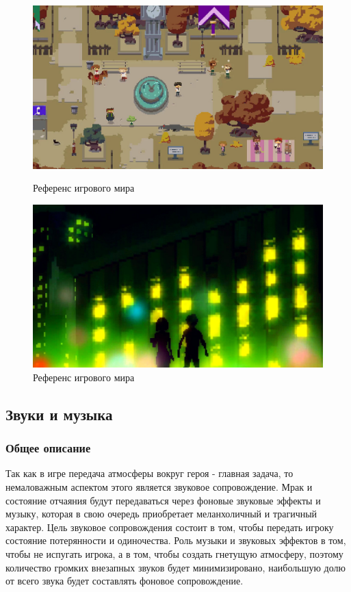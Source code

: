 \documentclass{article}
\begin{document}
	\begin{figure}[h]
		\begin{minipage}{0.4\textwidth}
			\centering
			\includegraphics[width=\textwidth]{images/park.jpg}
			\caption{Референс игрового мира}
			\label{fig:world1}
		\end{minipage} 
		\hfill
		\begin{minipage}{0.4\textwidth}
			\centering
			\includegraphics[width=\textwidth]{images/world.jpg}
			\caption{Референс игрового мира}
			\label{fig:world2}
		\end{minipage}
	\end{figure}
    
	\newpage	
	\subsection{Звуки и музыка}
	
	\subsubsection{Общее описание}

	Так как в игре передача атмосферы вокруг героя - главная задача, то немаловажным аспектом этого является звуковое 
	сопровождение. Мрак и состояние отчаяния будут передаваться через фоновые звуковые эффекты и музыку, которая в 
	свою очередь приобретает меланхоличный и трагичный характер. Цель звуковое сопровождения состоит в том,
	чтобы передать игроку состояние потерянности и одиночества. Роль музыки и звуковых эффектов в том, чтобы не испугать игрока,
	а в том, чтобы создать гнетущую атмосферу, поэтому количество громких внезапных звуков будет минимизировано, наибольшую долю 
	от всего звука будет составлять фоновое сопровождение. 
	
\end{document}
